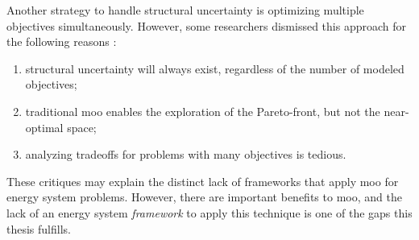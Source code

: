 Another strategy to handle structural uncertainty is optimizing multiple
objectives simultaneously. However, some researchers dismissed this approach for
the following reasons \cite{decarolis_using_2011}:
\begin{enumerate}
    \item structural uncertainty will always exist, regardless of the number of
    modeled objectives;
    \item traditional \ac{moo} enables the exploration of the Pareto-front, but
    not the near-optimal space;
    \item analyzing tradeoffs for problems with many objectives is tedious.
\end{enumerate}
These critiques may explain the distinct lack of frameworks that apply \ac{moo}
for energy system problems. However, there are important benefits to \ac{moo},
and the lack of an energy system \textit{framework} to apply this technique is
one of the gaps this thesis fulfills.



